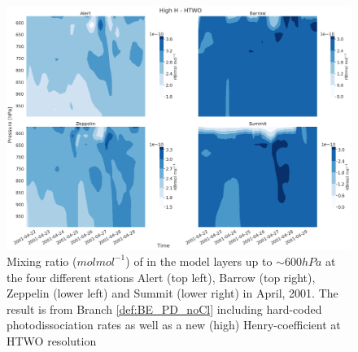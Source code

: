 \begin{figure}[h]
    \centering
    \includegraphics[width=\linewidth]{Chapter6_Results/images/vertHBr_HTWO_step3.png}
    \caption{Mixing ratio ($mol mol^{-1}$) of  in the model layers up to $\sim 600 hPa$ at the four different stations Alert (top left), Barrow (top right), Zeppelin (lower left) and Summit (lower right) in April, 2001. The result is from Branch \ref{def:BE_PD_noCl} including hard-coded photodissociation rates as well as a new (high) Henry-coefficient at HTWO resolution}
    \label{fig:vertHBr_HTWO_step3}
\end{figure}